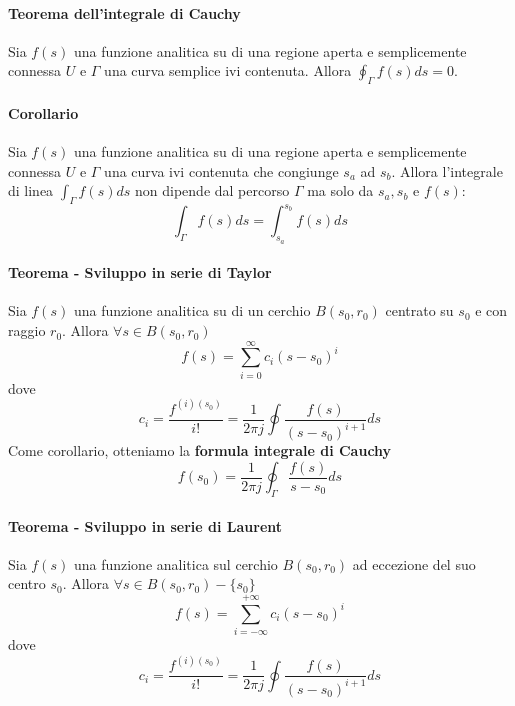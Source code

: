 \documentclass[11pt]{article}
\begin{document}
\paragraph{Teorema dell'integrale di Cauchy}
Sia $f(s)$ una funzione analitica su di una regione aperta e semplicemente connessa $U$ e $\Gamma$ una curva semplice ivi contenuta. Allora $\oint_\Gamma f(s) ds = 0$. 
\paragraph{Corollario}
Sia $f(s)$ una funzione analitica su di una regione aperta e semplicemente connessa $U$ e $\Gamma$ una curva ivi contenuta che congiunge $s_a$ ad $s_b$. Allora l'integrale di linea $\int_\Gamma f(s)ds$ non dipende dal percorso $\Gamma$ ma solo da $s_a, s_b$ e $f(s)$:
\begin{displaymath}
    \int_\Gamma f(s)ds = \int_{s_a}^{s_b} f(s)ds
\end{displaymath}
\paragraph{Teorema - Sviluppo in serie di Taylor}
Sia $f(s)$ una funzione analitica su di un cerchio $B(s_0, r_0)$ centrato su $s_0$ e con raggio $r_0$. Allora $\forall s \in B(s_0, r_0)$ 
\begin{displaymath}
    f(s) = \sum_{i=0}^\infty c_i (s-s_0)^i
\end{displaymath}
dove 
\begin{displaymath}
    c_i = \frac{f^{(i) (s_0)}}{i!} = \frac{1}{2\pi j}\oint \frac{f(s)}{(s-s_0)^{i+1}}ds
\end{displaymath}
Come corollario, otteniamo la \textbf{formula integrale di Cauchy}
\begin{displaymath}
    f(s_0) = \frac{1}{2\pi j} \oint_\Gamma \frac{f(s)}{s-s_0} ds
\end{displaymath}
\paragraph{Teorema - Sviluppo in serie di Laurent}
Sia $f(s)$ una funzione analitica sul cerchio $B(s_0, r_0)$ ad eccezione del suo centro $s_0$. Allora $\forall s \in B(s_0, r_0)- \{s_0\}$
\begin{displaymath}
    f(s) = \sum_{i=-\infty}^{+\infty} c_i(s-s_0)^i
\end{displaymath}
dove 
\begin{displaymath}
    c_i = \frac{f^{(i) (s_0)}}{i!} = \frac{1}{2\pi j}\oint \frac{f(s)}{(s-s_0)^{i+1}}ds
\end{displaymath}
\end{document}
